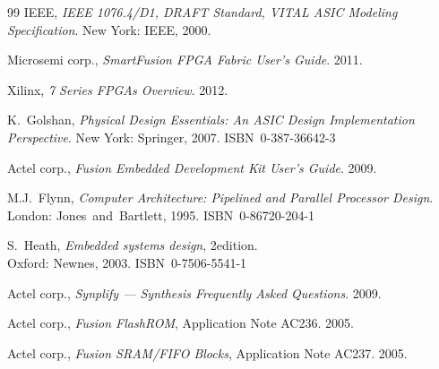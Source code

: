 \documentclass[12pt,a4paper]{article}
\begin{document}
{\begin{thebibliography}{99}
			IEEE,
			\textit{IEEE 1076.4/D1, DRAFT Standard, VITAL ASIC Modeling Specification}.
			New York: IEEE, 2000.

			Microsemi corp.,
			\textit{SmartFusion FPGA Fabric User's Guide}.
			2011.

			Xilinx,
			\textit{7 Series FPGAs Overview}.
			2012.

			K.~Golshan,
			\textit{Physical Design Essentials: An ASIC Design Implementation Perspective}.
			New York: Springer, 2007. ISBN~0-387-36642-3

			Actel corp.,
			\textit{Fusion Embedded Development Kit User's Guide}.
			2009.

			M.J.~Flynn,
			\textit{Computer Architecture: Pipelined and Parallel Processor Design}.
			\linebreak[3]
			London: Jones~and~Bartlett, 1995. ISBN~0-86720-204-1

			S.~Heath,
			\textit{Embedded systems design}, 2\nd edition.\\
			Oxford: Newnes, 2003. ISBN~0-7506-5541-1

			Actel corp.,
			\textit{Synplify — Synthesis Frequently Asked Questions}.
			2009.

			Actel corp.,
			\textit{Fusion FlashROM}, Application Note AC236.
			2005.

			Actel corp.,
			\textit{Fusion SRAM/FIFO Blocks}, Application Note AC237.
			2005.

	\end{thebibliography}
	} %
	
	\clearpage
	
	
	\clearpage
	\begin{appendices} %
	
	\end{appendices}
\end{document}

